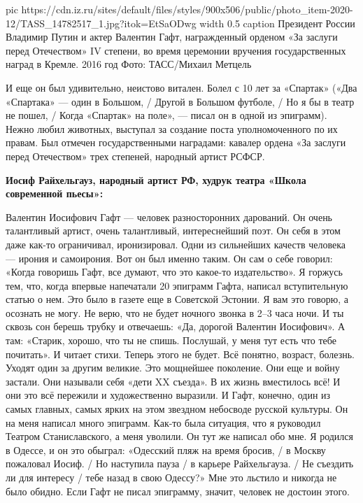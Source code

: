 \ifcmt
  pic https://cdn.iz.ru/sites/default/files/styles/900x506/public/photo_item-2020-12/TASS_14782517_1.jpg?itok=EtSaODwg
  width 0.5
	caption Президент России Владимир Путин и актер Валентин Гафт, награжденный орденом «За заслуги перед Отечеством» IV степени, во время церемонии вручения государственных наград в Кремле. 2016 год Фото: ТАСС/Михаил Метцель 
\fi

И еще он был удивительно, неистово витален. Болел с 10 лет за «Спартак» («Два
«Спартака» — один в Большом, / Другой в Большом футболе, / Но я бы в театр не
пошел, / Когда «Спартак» на поле», — писал он в одной из эпиграмм). Нежно любил
животных, выступал за создание поста уполномоченного по их правам. Был отмечен
государственными наградами: кавалер ордена «За заслуги перед Отечеством» трех
степеней, народный артист РСФСР.

\textbf{Иосиф Райхельгауз, народный артист РФ, худрук театра «Школа современной пьесы»:}
  
\begingroup
\styleMP
Валентин Иосифович Гафт — человек
разносторонних дарований. Он очень талантливый артист, очень
талантливый, интереснейший поэт. Он себя в этом даже как-то
ограничивал, иронизировал. Одни из сильнейших качеств человека —
ирония и самоирония. Вот он был именно таким. Он сам о себе говорил:
«Когда говоришь Гафт, все думают, что это какое-то издательство». Я
горжусь тем, что, когда впервые напечатали 20 эпиграмм Гафта, написал
вступительную статью о нем. Это было в газете еще в Советской
Эстонии. Я вам это говорю, а осознать не могу. Не верю, что не будет
ночного звонка в 2–3 часа ночи. И ты сквозь сон берешь трубку и
отвечаешь: «Да, дорогой Валентин Иосифович». А там: «Старик, хорошо,
что ты не спишь. Послушай, у меня тут есть что тебе почитать». И
читает стихи. Теперь этого не будет. Всё понятно, возраст, болезнь.
Уходят один за другим великие. Это мощнейшее поколение. Они еще и
войну застали. Они называли себя «дети XX съезда». В их жизнь
вместилось всё! И они это всё пережили и художественно выразили. И
Гафт, конечно, один из самых главных, самых ярких на этом звездном
небосводе русской культуры. Он на меня написал много эпиграмм. Как-то
была ситуация, что я руководил Театром Станиславского, а меня
уволили. Он тут же написал обо мне. Я родился в Одессе, и он это
обыграл: «Одесский пляж на время бросив, / в Москву пожаловал Иосиф.
/ Но наступила пауза / в карьере Райхельгауза. / Не съездить ли для
интересу / тебе назад в свою Одессу?» Мне это льстило и никогда не
было обидно. Если Гафт не писал эпиграмму, значит, человек не достоин
этого.
\endgroup

